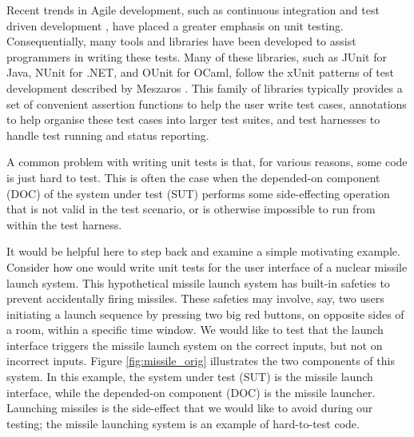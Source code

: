 \documentclass[proposal]{softeng}
\begin{document}

Recent trends in Agile development, such as continuous integration
\cite{humble:continuous} and test driven development \cite{beck:tdd},
have placed a greater emphasis on unit testing. Consequentially, many
tools and libraries have been developed to assist programmers in
writing these tests. Many of these libraries, such as JUnit
\cite{www:junit} for Java, NUnit \cite{www:nunit} for .NET, and OUnit
\cite{www:ounit} for OCaml, follow the xUnit patterns of test
development described by Meszaros \cite{meszaros:xunit}. This family
of libraries typically provides a set of convenient assertion
functions to help the user write test cases, annotations to help
organise these test cases into larger test suites, and test harnesses
to handle test running and status reporting.

A common problem with writing unit tests is that, for various reasons,
some code is just hard to test. This is often the case when the
depended-on component (DOC) of the system under test (SUT) performs
some side-effecting operation that is not valid in the test scenario,
or is otherwise impossible to run from within the test
harness.

It would be helpful here to step back and examine a simple motivating
example. Consider how one would write unit tests for the user
interface of a nuclear missile launch system. This hypothetical
missile launch system has built-in safeties to prevent accidentally
firing missiles. These safeties may involve, say, two users initiating
a launch sequence by pressing two big red buttons, on opposite sides
of a room, within a specific time window. We would like to test that
the launch interface triggers the missile launch system on the correct
inputs, but not on incorrect inputs. Figure \ref{fig:missile_orig}
illustrates the two components of this system. In this example, the
system under test (SUT) is the missile launch interface, while the
depended-on component (DOC) is the missile launcher. Launching
missiles is the side-effect that we would like to avoid during our
testing; the missile launching system is an example of hard-to-test
code.
\end{document}
